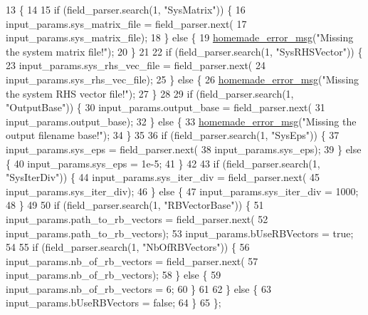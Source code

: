 \begin{DoxyCode}
13                                                                 \{
14 
15     \textcolor{keywordflow}{if} (field\_parser.search(1, \textcolor{stringliteral}{"SysMatrix"})) \{
16         input\_params.sys\_matrix\_file = field\_parser.next(
17                 input\_params.sys\_matrix\_file);
18     \} \textcolor{keywordflow}{else} \{
19         \hyperlink{common__header_8h_a05d65d26b911668ac90085745dca71f6}{homemade\_error\_msg}(\textcolor{stringliteral}{"Missing the system matrix file!"});
20     \}
21 
22     \textcolor{keywordflow}{if} (field\_parser.search(1, \textcolor{stringliteral}{"SysRHSVector"})) \{
23         input\_params.sys\_rhs\_vec\_file = field\_parser.next(
24                 input\_params.sys\_rhs\_vec\_file);
25     \} \textcolor{keywordflow}{else} \{
26         \hyperlink{common__header_8h_a05d65d26b911668ac90085745dca71f6}{homemade\_error\_msg}(\textcolor{stringliteral}{"Missing the system RHS vector file!"});
27     \}
28 
29     \textcolor{keywordflow}{if} (field\_parser.search(1, \textcolor{stringliteral}{"OutputBase"})) \{
30         input\_params.output\_base = field\_parser.next(
31                 input\_params.output\_base);
32     \} \textcolor{keywordflow}{else} \{
33         \hyperlink{common__header_8h_a05d65d26b911668ac90085745dca71f6}{homemade\_error\_msg}(\textcolor{stringliteral}{"Missing the output filename base!"});
34     \}
35 
36     \textcolor{keywordflow}{if} (field\_parser.search(1, \textcolor{stringliteral}{"SysEps"})) \{
37         input\_params.sys\_eps = field\_parser.next(
38                 input\_params.sys\_eps);
39     \} \textcolor{keywordflow}{else} \{
40         input\_params.sys\_eps = 1e-5;
41     \}
42 
43     \textcolor{keywordflow}{if} (field\_parser.search(1, \textcolor{stringliteral}{"SysIterDiv"})) \{
44         input\_params.sys\_iter\_div = field\_parser.next(
45                 input\_params.sys\_iter\_div);
46     \} \textcolor{keywordflow}{else} \{
47         input\_params.sys\_iter\_div = 1000;
48     \}
49 
50     \textcolor{keywordflow}{if} (field\_parser.search(1, \textcolor{stringliteral}{"RBVectorBase"})) \{
51         input\_params.path\_to\_rb\_vectors = field\_parser.next(
52                 input\_params.path\_to\_rb\_vectors);
53         input\_params.bUseRBVectors = \textcolor{keyword}{true};
54 
55         \textcolor{keywordflow}{if} (field\_parser.search(1, \textcolor{stringliteral}{"NbOfRBVectors"})) \{
56             input\_params.nb\_of\_rb\_vectors = field\_parser.next(
57                     input\_params.nb\_of\_rb\_vectors);
58         \} \textcolor{keywordflow}{else} \{
59             input\_params.nb\_of\_rb\_vectors = 6;
60         \}
61 
62     \} \textcolor{keywordflow}{else} \{
63         input\_params.bUseRBVectors = \textcolor{keyword}{false};
64     \}
65 \};
\end{DoxyCode}
\hypertarget{namespacecarl_a902f88f3c52c6fc9c974bc99832e78a7}{}
